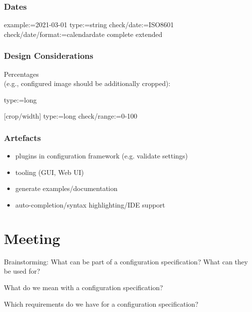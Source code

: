 \begin{frame}[fragile]
	\frametitle{Dates}
	\small
	\begin{code}[morekeywords={type,date,format,example},gobble=4]
	[mydate]
	example:=2021-03-01
	type:=string
	check/date:=ISO8601
	check/date/format:=calendardate complete extended
	\end{code}
\end{frame}

\begin{frame}[fragile]
	\frametitle{Design Considerations}
	Percentages
	\\ (e.g., configured image should be additionally cropped):
	\begin{code}
	type:=long

	[crop/width]
	type:=long
	check/range:=0-100
	\end{code}
\end{frame}

\begin{frame}
	\frametitle{Artefacts}
	\begin{itemize}
	\item plugins in configuration framework (e.g. validate settings)
	\item tooling (GUI, Web UI)
	\item generate examples/documentation
	\item auto-completion/syntax highlighting/IDE support
	\end{itemize}
\end{frame}




\section{Meeting}

\begin{assignment}
	\begin{task}
	Brainstorming: What can be part of a configuration specification?
	What can they be used for?
	\end{task}
\end{assignment}

\begin{assignment}
	\begin{task}
	What do we mean with a configuration specification?
	\end{task}

	\begin{task}
	Which requirements do we have for a configuration specification?
	\end{task}
\end{assignment}


